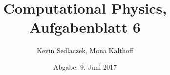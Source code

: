 \documentclass[11pt,a4paper,twoside]{article}
\title{Computational Physics, Aufgabenblatt 6}
\author{Kevin Sedlaczek, Mona Kalthoff}
\date{Abgabe: 9. Juni 2017}
\begin{document}



%
%






\setcounter{page}{0}





\begin{appendix}
%
\end{appendix}
\end{document}
